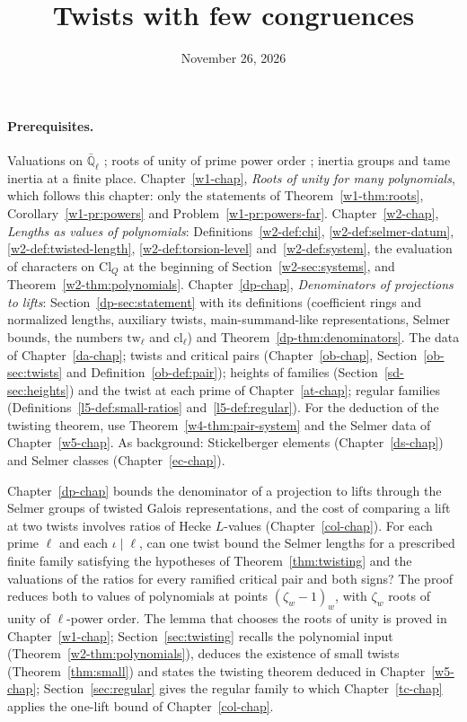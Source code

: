 \documentclass[reqno]{amsart}
\title{Twists with few congruences}
\author{}
\date{November 26, 2026}
\newcounter{chap}
\theoremstyle{definition}
\theoremstyle{plain}
\newcommand{\Ql}{\bar{\mathbb{Q}}_\ell}
\newcommand{\cl}{\mathrm{cl}}
\begin{document}
\maketitle
{}\label{chap}

\paragraph{Prerequisites.}
Valuations on \(\Ql\) \cite[Ch.~II]{Ne}; roots of unity of prime power order \cite[Ch.~1--2]{Wa}; inertia groups and tame inertia at a finite place.  Chapter~\ref{w1-chap}, \emph{Roots of unity for many polynomials}, which follows this chapter: only the statements of Theorem~\ref{w1-thm:roots}, Corollary~\ref{w1-pr:powers} and Problem~\ref{w1-pr:powers-far}.  Chapter~\ref{w2-chap}, \emph{Lengths as values of polynomials}: Definitions~\ref{w2-def:chi}, \ref{w2-def:selmer-datum}, \ref{w2-def:twisted-length}, \ref{w2-def:torsion-level} and~\ref{w2-def:system}, the evaluation of characters on \(\mathrm{Cl}_Q\) at the beginning of Section~\ref{w2-sec:systems}, and Theorem~\ref{w2-thm:polynomials}.  Chapter~\ref{dp-chap}, \emph{Denominators of projections to lifts}: Section~\ref{dp-sec:statement} with its definitions (coefficient rings and normalized lengths, auxiliary twists, main-summand-like representations, Selmer bounds, the numbers \(\mathrm{tw}_\ell\) and \(\cl_\ell\)) and Theorem~\ref{dp-thm:denominators}.  The data of Chapter~\ref{da-chap}; twists and critical pairs (Chapter~\ref{ob-chap}, Section~\ref{ob-sec:twists} and Definition~\ref{ob-def:pair}); heights of families (Section~\ref{sd-sec:heights}) and the twist at each prime of Chapter~\ref{at-chap}; regular families (Definitions~\ref{l5-def:small-ratios} and~\ref{l5-def:regular}).  For the deduction of the twisting theorem, use Theorem~\ref{w4-thm:pair-system} and the Selmer data of Chapter~\ref{w5-chap}.  As background: Stickelberger elements (Chapter~\ref{ds-chap}) and Selmer classes (Chapter~\ref{ec-chap}).

\medskip
Chapter~\ref{dp-chap} bounds the denominator of a projection to lifts through the Selmer groups of twisted Galois representations, and the cost of comparing a lift at two twists involves ratios of Hecke \(L\)-values (Chapter~\ref{col-chap}).  For each prime \(\ell\) and each \(\iota \mid \ell\), can one twist bound the Selmer lengths for a prescribed finite family satisfying the hypotheses of Theorem~\ref{thm:twisting} and the valuations of the ratios for every ramified critical pair and both signs?  The proof reduces both to values of polynomials at points \((\zeta_w-1)_w\), with \(\zeta_w\) roots of unity of \(\ell\)-power order.  The lemma that chooses the roots of unity is proved in Chapter~\ref{w1-chap}; Section~\ref{sec:twisting} recalls the polynomial input (Theorem~\ref{w2-thm:polynomials}), deduces the existence of small twists (Theorem~\ref{thm:small}) and states the twisting theorem deduced in Chapter~\ref{w5-chap}; Section~\ref{sec:regular} gives the regular family to which Chapter~\ref{tc-chap} applies the one-lift bound of Chapter~\ref{col-chap}.
\end{document}
